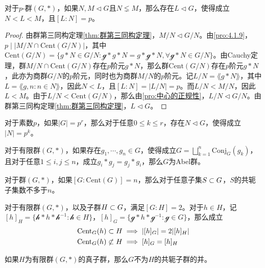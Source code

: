 \begin{proposition}
	对于$p$-群$(G,*)$，如果$N,M\lhd G$且$N\lneq M$，那么存在$L\lhd G$，使得成立$N<L<M$，且$[L:N]=p$。
\end{proposition}

\begin{proof}
	由群第三同构定理\ref{thm:群第三同构定理}，$M/N\lhd G/N$。由\ref{pro:4.1.9}，$p\mid |M/N\cap\mathrm{Cent}(G/N)|$，其中$\mathrm{Cent}(G/N)=\{ g*N\in G/N:\mathcal{g}*g*N=g*\mathcal{g}*N,\forall \mathcal{g}*N\in G/N \}$。由Cauchy定理，群$M/N\cap\mathrm{Cent}(G/N)$存在$p$阶元$g*N$，那么群$\mathrm{Cent}(G/N)$存在$p$阶元$g*N$，此亦为商群$G/N$的$p$阶元，同时也为商群$M/N$的$p$阶元。记$L/N=\lang g*N\rang$，其中$L=\lang g,n:n\in N\rang$，因此$N<L$，且$[L:N]=|L/N|=p$。而$L/N<M/N$，因此$L<M$。由于$L/N<\mathrm{Cent}(G/N)$，那么由\ref{pro:中心的正规性}，$L/N\lhd G/N$。由群第三同构定理\ref{thm:群第三同构定理}，$L\lhd G$。
\end{proof}

\begin{corollary}
	对于素数$p$，如果$|G|=p^r$，那么对于任意$0\le k \le r$，存在$N\lhd G$，使得成立$|N|=p^k$。
\end{corollary}

\begin{proposition}
	对于有限群$(G,*)$，如果存在$g_1,\cdots,g_n\in G$，使得成立$\displaystyle G=\bigsqcup_{k=1}^{n}\mathrm{Conj}_G(g_k)$，且对于任意$1\le i,j\le n$，成立$g_i*g_j=g_j*g_i$，那么$G$为Abel群。
\end{proposition}

\begin{proposition}
	对于群$(G,*)$，如果$[G:\mathrm{Cent}(G)]=n$，那么对于任意子集$S\subset G$，$S$的共轭子集数不多于$n$。
\end{proposition}

\begin{proposition}
	对于有限群$(G,*)$，以及子群$H\subset G$，满足$[G:H]=2$。对于$h\in H$，记$[h]_{H}=\{ \mathcal{h}*h*\mathcal{h}^{-1}:\mathcal{h}\in H \}$，$[h]_{G}=\{ \mathcal{g}*h*\mathcal{g}^{-1}:\mathcal{g}\in G \}$，那么成立
	\begin{align*}
		&\mathrm{Cent}_G(h)\subset H\implies |[h]_G|=2|[h]_H|\\
		&\mathrm{Cent}_G(h)\not\subset H\implies [h]_G=[h]_H
	\end{align*}
\end{proposition}

\begin{proposition}
	如果$H$为有限群$(G,*)$的真子群，那么$G$不为$H$的共轭子群的并。
\end{proposition}

